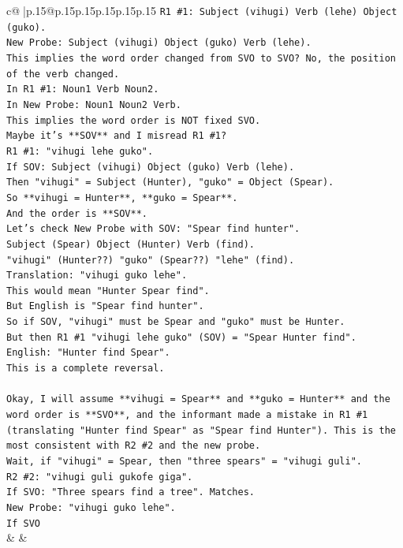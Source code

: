 \documentclass{article}
\begin{document}
{\begin{supertabular}{c@{$\;$}|p{.15\linewidth}@{}p{.15\linewidth}p{.15\linewidth}p{.15\linewidth}p{.15\linewidth}p{.15\linewidth}}
{{{\texttt{R1 \#1: Subject (vihugi) Verb (lehe) Object (guko).} \\
\texttt{New Probe: Subject (vihugi) Object (guko) Verb (lehe).} \\
\texttt{This implies the word order changed from SVO to SVO? No, the position of the verb changed.} \\
\texttt{In R1 \#1: Noun1 Verb Noun2.} \\
\texttt{In New Probe: Noun1 Noun2 Verb.} \\
\texttt{This implies the word order is NOT fixed SVO.} \\
\texttt{Maybe it's **SOV** and I misread R1 \#1?} \\
\texttt{R1 \#1: "vihugi lehe guko".} \\
\texttt{If SOV: Subject (vihugi) Object (guko) Verb (lehe).} \\
\texttt{Then "vihugi" = Subject (Hunter), "guko" = Object (Spear).} \\
\texttt{So **vihugi = Hunter**, **guko = Spear**.} \\
\texttt{And the order is **SOV**.} \\
\texttt{Let's check New Probe with SOV: "Spear find hunter".} \\
\texttt{Subject (Spear) Object (Hunter) Verb (find).} \\
\texttt{"vihugi" (Hunter??) "guko" (Spear??) "lehe" (find).} \\
\texttt{Translation: "vihugi guko lehe".} \\
\texttt{This would mean "Hunter Spear find".} \\
\texttt{But English is "Spear find hunter".} \\
\texttt{So if SOV, "vihugi" must be Spear and "guko" must be Hunter.} \\
\texttt{But then R1 \#1 "vihugi lehe guko" (SOV) = "Spear Hunter find".} \\
\texttt{English: "Hunter find Spear".} \\
\texttt{This is a complete reversal.} \\
\\ 
\texttt{Okay, I will assume **vihugi = Spear** and **guko = Hunter** and the word order is **SVO**, and the informant made a mistake in R1 \#1 (translating "Hunter find Spear" as "Spear find Hunter"). This is the most consistent with R2 \#2 and the new probe.} \\
\texttt{Wait, if "vihugi" = Spear, then "three spears" = "vihugi guli".} \\
\texttt{R2 \#2: "vihugi guli gukofe giga".} \\
\texttt{If SVO: "Three spears find a tree". Matches.} \\
\texttt{New Probe: "vihugi guko lehe".} \\
\texttt{If SVO} \\
            }
        }
    }
    & & \\ \\


\end{supertabular}}
\end{document}
